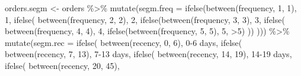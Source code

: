 \documentclass[
]{book}
\newenvironment{Shaded}{\begin{snugshade}}{\end{snugshade}}
\newcommand{\AttributeTok}[1]{\textcolor[rgb]{0.77,0.63,0.00}{#1}}
\newcommand{\DecValTok}[1]{\textcolor[rgb]{0.00,0.00,0.81}{#1}}
\newcommand{\FunctionTok}[1]{\textcolor[rgb]{0.00,0.00,0.00}{#1}}
\newcommand{\NormalTok}[1]{#1}
\newcommand{\OtherTok}[1]{\textcolor[rgb]{0.56,0.35,0.01}{#1}}
\newcommand{\SpecialCharTok}[1]{\textcolor[rgb]{0.00,0.00,0.00}{#1}}
\newcommand{\StringTok}[1]{\textcolor[rgb]{0.31,0.60,0.02}{#1}}
\begin{document}
\begin{Shaded}
\begin{Highlighting}[]
\NormalTok{orders.segm }\OtherTok{\textless{}{-}}\NormalTok{ orders }\SpecialCharTok{\%\textgreater{}\%}
    \FunctionTok{mutate}\NormalTok{(}\AttributeTok{segm.freq =} \FunctionTok{ifelse}\NormalTok{(}\FunctionTok{between}\NormalTok{(frequency, }\DecValTok{1}\NormalTok{, }\DecValTok{1}\NormalTok{), }\StringTok{\textquotesingle{}1\textquotesingle{}}\NormalTok{,}
                              \FunctionTok{ifelse}\NormalTok{(}
                                  \FunctionTok{between}\NormalTok{(frequency, }\DecValTok{2}\NormalTok{, }\DecValTok{2}\NormalTok{), }\StringTok{\textquotesingle{}2\textquotesingle{}}\NormalTok{,}
                                  \FunctionTok{ifelse}\NormalTok{(}\FunctionTok{between}\NormalTok{(frequency, }\DecValTok{3}\NormalTok{, }\DecValTok{3}\NormalTok{), }\StringTok{\textquotesingle{}3\textquotesingle{}}\NormalTok{,}
                                         \FunctionTok{ifelse}\NormalTok{(}
                                             \FunctionTok{between}\NormalTok{(frequency, }\DecValTok{4}\NormalTok{, }\DecValTok{4}\NormalTok{), }\StringTok{\textquotesingle{}4\textquotesingle{}}\NormalTok{,}
                                             \FunctionTok{ifelse}\NormalTok{(}\FunctionTok{between}\NormalTok{(frequency, }\DecValTok{5}\NormalTok{, }\DecValTok{5}\NormalTok{), }\StringTok{\textquotesingle{}5\textquotesingle{}}\NormalTok{, }\StringTok{\textquotesingle{}\textgreater{}5\textquotesingle{}}\NormalTok{)}
\NormalTok{                                         ))}
\NormalTok{                              ))) }\SpecialCharTok{\%\textgreater{}\%}
    \FunctionTok{mutate}\NormalTok{(}\AttributeTok{segm.rec =} \FunctionTok{ifelse}\NormalTok{(}
        \FunctionTok{between}\NormalTok{(recency, }\DecValTok{0}\NormalTok{, }\DecValTok{6}\NormalTok{),}
        \StringTok{\textquotesingle{}0{-}6 days\textquotesingle{}}\NormalTok{,}
        \FunctionTok{ifelse}\NormalTok{(}
            \FunctionTok{between}\NormalTok{(recency, }\DecValTok{7}\NormalTok{, }\DecValTok{13}\NormalTok{),}
            \StringTok{\textquotesingle{}7{-}13 days\textquotesingle{}}\NormalTok{,}
            \FunctionTok{ifelse}\NormalTok{(}
                \FunctionTok{between}\NormalTok{(recency, }\DecValTok{14}\NormalTok{, }\DecValTok{19}\NormalTok{),}
                \StringTok{\textquotesingle{}14{-}19 days\textquotesingle{}}\NormalTok{,}
                \FunctionTok{ifelse}\NormalTok{(}
                    \FunctionTok{between}\NormalTok{(recency, }\DecValTok{20}\NormalTok{, }\DecValTok{45}\NormalTok{),}

\end{Highlighting}
\end{Shaded}
\end{document}
